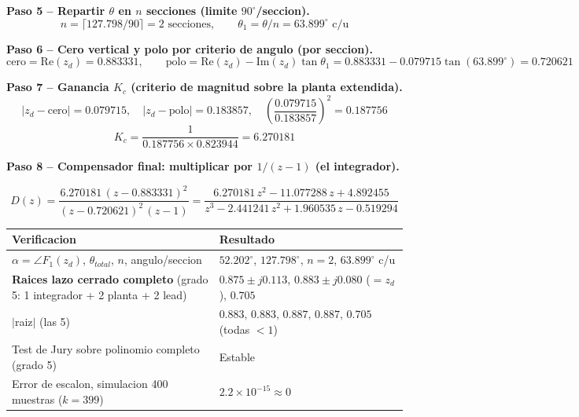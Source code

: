 \documentclass[11pt]{article}
\begin{document}
\textbf{Paso 5 -- Repartir $\theta$ en $n$ secciones (limite $90^\circ$/seccion).}
\begin{equation}
n=\lceil 127.798/90\rceil=2\text{ secciones},\qquad
\theta_1=\theta/n=63.899^\circ\text{ c/u}
\end{equation}

\textbf{Paso 6 -- Cero vertical y polo por criterio de angulo (por seccion).}
\begin{equation}
\text{cero}=\mathrm{Re}(z_d)=0.883331,\qquad
\text{polo}=\mathrm{Re}(z_d)-\mathrm{Im}(z_d)\tan\theta_1=0.883331-0.079715\tan(63.899^\circ)=0.720621
\end{equation}

\textbf{Paso 7 -- Ganancia $K_c$ (criterio de magnitud sobre la planta extendida).}
\begin{equation}
|z_d-\text{cero}|=0.079715,\quad |z_d-\text{polo}|=0.183857,\quad
\left(\frac{0.079715}{0.183857}\right)^2=0.187756
\end{equation}
\begin{equation}
K_c=\frac{1}{0.187756\times0.823944}=6.270181
\end{equation}

\textbf{Paso 8 -- Compensador final: multiplicar por $1/(z-1)$ (el integrador).}
\begin{resultbox}
\begin{equation}
D(z)=\frac{6.270181\,(z-0.883331)^2}{(z-0.720621)^2\,(z-1)}
=\frac{6.270181\,z^2-11.077288\,z+4.892455}{z^3-2.441241\,z^2+1.960535\,z-0.519294}
\end{equation}
\end{resultbox}

\begin{center}
\begin{tabular}{@{}ll@{}}
\toprule
Verificacion & Resultado \\
\midrule
$\alpha=\angle F_1(z_d)$, $\theta_{total}$, $n$, angulo/seccion &
$52.202^\circ$, $127.798^\circ$, $n=2$, $63.899^\circ$ c/u \\
\textbf{Raices lazo cerrado completo} (grado 5: 1 integrador + 2 planta + 2 lead) &
$0.875{\pm}j0.113$, $0.883{\pm}j0.080$ ($=z_d$), $0.705$ \\
$|$raiz$|$ (las 5) & $0.883,\,0.883,\,0.887,\,0.887,\,0.705$ (todas $<1$) \\
Test de Jury sobre polinomio completo (grado 5) & Estable \\
Error de escalon, simulacion 400 muestras ($k=399$) & $2.2\times10^{-15}\approx 0$ \\
\bottomrule
\end{tabular}
\end{center}
\end{document}
